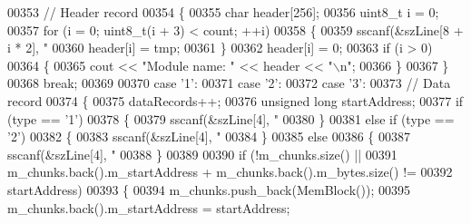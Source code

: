 \begin{DoxyCode}
{{{{{{{{{{{00353                     \textcolor{comment}{// Header record}
00354                     \{
00355                         \textcolor{keywordtype}{char} header[256];
00356                         uint8\_t i = 0;
00357                         \textcolor{keywordflow}{for} (i = 0; uint8\_t(i + 3) < count; ++i)
00358                         \{
00359                             sscanf(&szLine[8 + i * 2], \textcolor{stringliteral}{"%
00360                             header[i] = tmp;
00361                         \}
00362                         header[i] = 0;
00363                         \textcolor{keywordflow}{if} (i > 0)
00364                         \{
00365                             cout << \textcolor{stringliteral}{"Module name: "} << header << \textcolor{stringliteral}{"\(\backslash\)n"};
00366                         \}
00367                     \}
00368                     \textcolor{keywordflow}{break};
00369 
00370                 \textcolor{keywordflow}{case} \textcolor{charliteral}{'1'}:
00371                 \textcolor{keywordflow}{case} \textcolor{charliteral}{'2'}:
00372                 \textcolor{keywordflow}{case} \textcolor{charliteral}{'3'}:
00373                     \textcolor{comment}{// Data record}
00374                     \{
00375                         dataRecords++;
00376                         \textcolor{keywordtype}{unsigned} \textcolor{keywordtype}{long}   startAddress;
00377                         \textcolor{keywordflow}{if} (type == \textcolor{charliteral}{'1'})
00378                         \{
00379                             sscanf(&szLine[4], \textcolor{stringliteral}{"%
00380                         \}
00381                         \textcolor{keywordflow}{else} \textcolor{keywordflow}{if} (type == \textcolor{charliteral}{'2'})
00382                         \{
00383                             sscanf(&szLine[4], \textcolor{stringliteral}{"%
00384                         \}
00385                         \textcolor{keywordflow}{else}
00386                         \{
00387                             sscanf(&szLine[4], \textcolor{stringliteral}{"%
00388                         \}
00389 
00390                         \textcolor{keywordflow}{if} (!m\_chunks.size() ||
00391                             m\_chunks.back().m\_startAddress + m\_chunks.back().m\_bytes.size() !=
00392                             startAddress)
00393                         \{
00394                             m\_chunks.push\_back(MemBlock());
00395                             m\_chunks.back().m\_startAddress = startAddress;
}}}}}}}}}}}}}}}
\end{DoxyCode}
